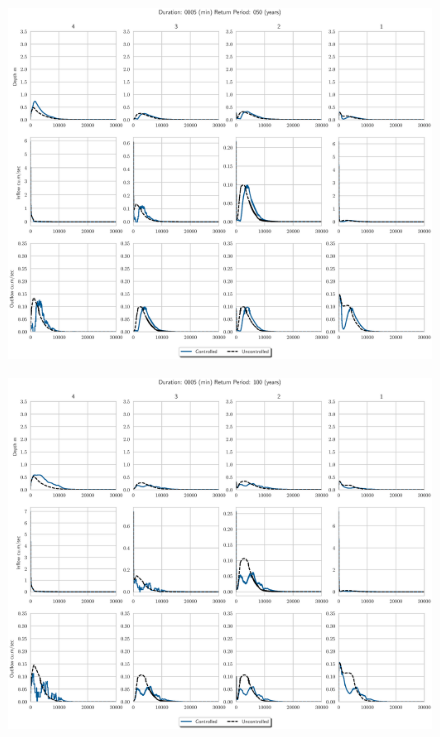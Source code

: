 \begin{figure}
    \centering
    \includegraphics[width=\linewidth]{./RL-SI-figures/77storms/0005050.eps}
\end{figure}
\begin{figure}
    \centering
    \includegraphics[width=\linewidth]{./RL-SI-figures/77storms/0005100.eps}
\end{figure}




